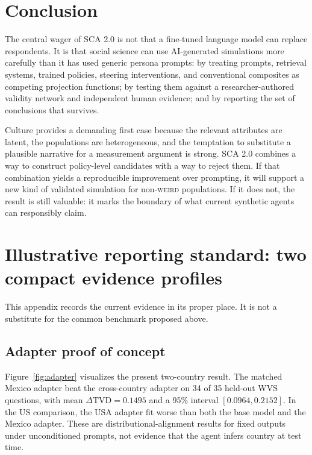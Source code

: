 \documentclass[10pt,letterpaper]{article}
\newcommand{\WEIRD}{\textsc{weird}}
\begin{document}
\section{Conclusion}
The central wager of SCA 2.0 is not that a fine-tuned language model can replace respondents. It is that social science can use AI-generated simulations more carefully than it has used generic persona prompts: by treating prompts, retrieval systems, trained policies, steering interventions, and conventional composites as competing projection functions; by testing them against a researcher-authored validity network and independent human evidence; and by reporting the set of conclusions that survives.

Culture provides a demanding first case because the relevant attributes are latent, the populations are heterogeneous, and the temptation to substitute a plausible narrative for a measurement argument is strong. SCA 2.0 combines a way to construct policy-level candidates with a way to reject them. If that combination yields a reproducible improvement over prompting, it will support a new kind of validated simulation for non-\WEIRD{} populations. If it does not, the result is still valuable: it marks the boundary of what current synthetic agents can responsibly claim.

\appendix
\section{Illustrative reporting standard: two compact evidence profiles}
This appendix records the current evidence in its proper place. It is not a substitute for the common benchmark proposed above.

\subsection{Adapter proof of concept}
Figure~\ref{fig:adapter} visualizes the present two-country result. The matched Mexico adapter beat the cross-country adapter on 34 of 35 held-out WVS questions, with mean $\Delta\mathrm{TVD}=0.1495$ and a 95\% interval $[0.0964,0.2152]$. In the US comparison, the USA adapter fit worse than both the base model and the Mexico adapter. These are distributional-alignment results for fixed outputs under unconditioned prompts, not evidence that the agent infers country at test time.
\end{document}
